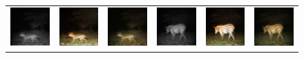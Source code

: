 \begin{figure}[htp!]
\begin{tabularx}{\textwidth}{>{\centering\arraybackslash}X >{\centering\arraybackslash}X >{\centering\arraybackslash}X >{\centering\arraybackslash}X >{\centering\arraybackslash}X >{\centering\arraybackslash}X}
        \includegraphics{gfx/conditional-diffusion-sampling-qual/nir_S2_B06_R1_PICT0128.jpg} & \includegraphics{gfx/conditional-diffusion-sampling-qual/cyclegan_S2_B06_R1_PICT0128_fake.png} & \includegraphics{gfx/conditional-diffusion-sampling-qual/diffusion_S2_B06_R1_PICT0128.png} & \includegraphics{gfx/conditional-diffusion-sampling-qual/nir_S2_B06_R1_PICT0279.jpg} & \includegraphics{gfx/conditional-diffusion-sampling-qual/cyclegan_S2_B06_R1_PICT0279_fake.png} & \includegraphics{gfx/conditional-diffusion-sampling-qual/diffusion_S2_B06_R1_PICT0279.png} \\

\end{tabularx}
\end{figure}
